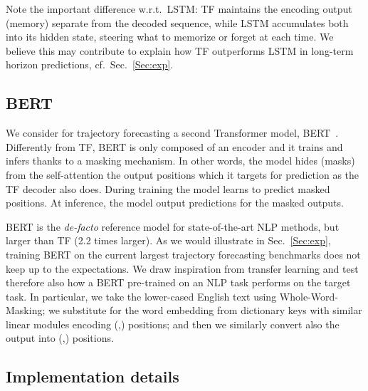 \documentclass[a4paper,conference]{IEEEtran}
\begin{document}
Note the important difference w.r.t.\ LSTM: TF maintains the encoding output (memory) separate from the decoded sequence, while LSTM accumulates both into its hidden state, steering what to memorize or forget at each time. We believe this may contribute to explain how TF outperforms LSTM in long-term horizon predictions, cf.\ Sec.~\ref{Sec:exp}.







\subsection{BERT}\label{sec:bert}

We consider for trajectory forecasting a second Transformer model, BERT~\cite{BERT19}.
Differently from TF, BERT is only composed of an encoder and it trains and infers thanks to a masking mechanism. In other words, the model hides (masks) from the self-attention the output positions which it targets for prediction as the TF decoder also does.
During training the model learns to predict masked positions. At inference, the model output predictions for the masked outputs.

BERT is the \textit{de-facto} reference model for state-of-the-art NLP methods, but larger than TF (2.2 times larger). As we would illustrate in Sec.~\ref{Sec:exp}, training BERT on the current largest trajectory forecasting benchmarks does not keep up to the expectations. We draw inspiration from transfer learning and test therefore also how a BERT pre-trained on an NLP task performs on the target task. In particular, we take the lower-cased English text using Whole-Word-Masking; we substitute for the word embedding from dictionary keys with similar linear modules encoding (,) positions; and then we similarly convert also the output into (,) positions.





\subsection{Implementation details}\label{sec:modtrain}
\end{document}
